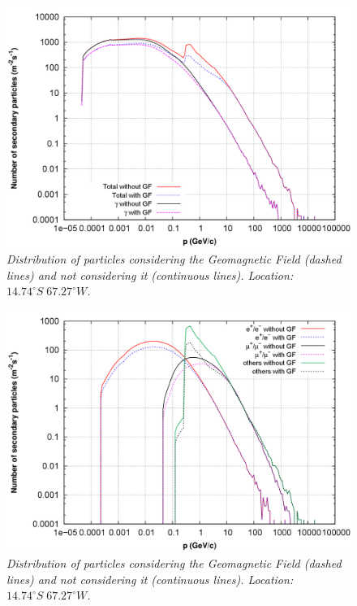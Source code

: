 \documentclass[3p,times,twocolumn]{elsarticle}
\begin{document}
\begin{figure}[H]
\centering
\includegraphics[scale=.14]{figures/g2_efectogeo.png}
\caption{\textit{Distribution of particles considering the Geomagnetic Field  (dashed lines) and not considering it (continuous lines). Location: $14.74^\circ S\;67.27^\circ W$.  }}
\label{fig:geo_effect1}
\end{figure}
\begin{figure}[H]
\centering
\includegraphics[scale=.14]{figures/g2_efectogeo2.png}
\caption{\textit{Distribution of particles considering the Geomagnetic Field  (dashed lines) and not considering it (continuous lines). Location: $14.74^\circ S\;67.27^\circ W$.}}
\label{fig:geo_effect2}
\end{figure}
\end{document}
